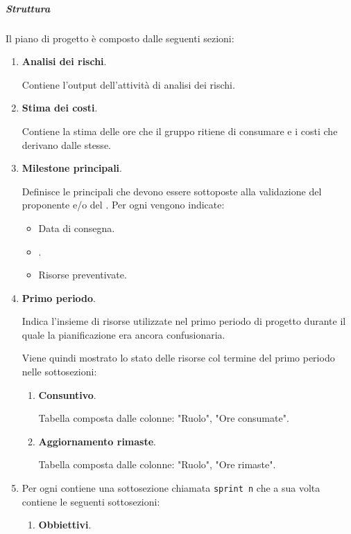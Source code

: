 \subparagraph{Struttura}
\label{subsec:struttura_piano}
Il piano di progetto è composto dalle seguenti sezioni:
\begin{enumerate}
    \item \textbf{Analisi dei rischi}.
    
    Contiene l'output dell'attività di analisi dei rischi.

    \item \textbf{Stima dei costi}.
    
    Contiene la stima delle ore che il gruppo ritiene di consumare e i costi che derivano dalle stesse. 
    
    \item \textbf{Milestone principali}.
    
    Definisce le  principali che devono essere sottoposte alla validazione del proponente e/o del .
    Per ogni  vengono indicate:
    \begin{itemize}
        \item Data di consegna.
        \item {}.
        \item Risorse preventivate.
    \end{itemize}
    
    \item \textbf{Primo periodo}. \label{par:primo_periodo}
    
    Indica l'insieme di risorse utilizzate nel primo periodo di progetto durante il quale la pianificazione era ancora confusionaria.
    
    Viene quindi mostrato lo stato delle risorse col termine del primo periodo nelle sottosezioni:
    \begin{enumerate}
        \item \textbf{Consuntivo}.
        
        Tabella composta dalle colonne: "Ruolo", "Ore consumate".

        \item \textbf{Aggiornamento rimaste}.
        
        Tabella composta dalle colonne: "Ruolo", "Ore rimaste".
    \end{enumerate}
    
    \item \textbf{} \label{par:sprint}
    
    Per ogni  contiene una sottosezione chiamata \texttt{sprint n} che a sua volta contiene le seguenti sottosezioni:
    \begin{enumerate}
        \item \textbf{Obbiettivi}.
        

\end{enumerate}
\end{enumerate}
